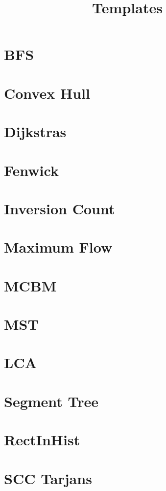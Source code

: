 \documentclass[twocolumn]{article}
\begin{document}
    \title{Templates}
    {\tiny
    \section{BFS}
    
    \section{Convex Hull}
    
    \section{Dijkstras}
    
    \newpage
    \section{Fenwick}
    
    \section{Inversion Count}
    
    \section{Maximum Flow}
    
    \section{MCBM}
    
    \section{MST}
    
    \newpage
    \section{LCA}
    
    \section{Segment Tree}
    
    \newpage
    \section{RectInHist}
    
    \section{SCC Tarjans}
    
    \newpage
}
\end{document}
